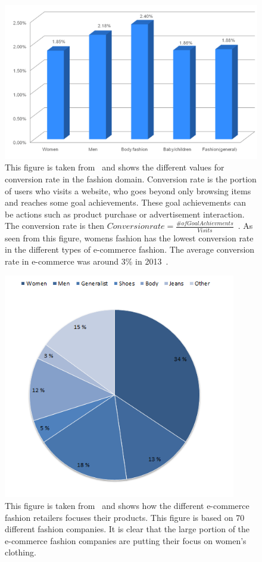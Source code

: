   \begin{figure}[H]
      \includegraphics[width=5in]{image/conversionRate.png}
      \centering
      \caption[Conversion Rate in Fashion Retail]{This figure is taken from~\cite{Jorij2012} and shows the different values for conversion rate in the fashion domain.
      Conversion rate is the portion of users who visits a website, who goes beyond only browsing items and reaches some goal achievements.
      These goal achievements can be actions such as product purchase or advertisement interaction.
      The conversion rate is then $Conversion rate = \frac{\# of Goal Achievments}{Visits}$~\cite{nielsen2013}.
      As seen from this figure, womens fashion has the lowest conversion rate in the different types of e-commerce fashion.
      The average conversion rate in e-commerce was around 3\% in 2013~\cite{nielsen2013}.
      }
  \end{figure}

  \begin{figure}[H]
      \includegraphics[width=4in]{image/ecommercefocus.png}
      \centering
      \caption[E-commerce benchmark and Fashion]{This figure is taken from~\cite{Jorij2012} and shows how the different e-commerce fashion retailers focuses their products.
      This figure is based on 70 different fashion companies.
      It is clear that the large portion of the e-commerce fashion companies are putting their focus on women's clothing.}
  \end{figure}

